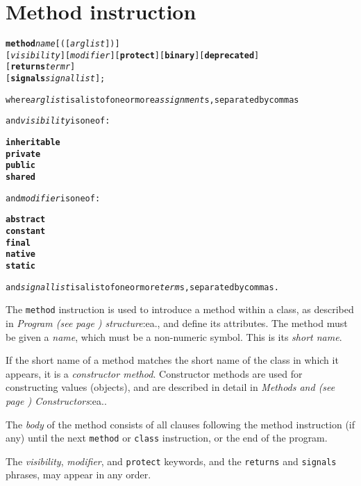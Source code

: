 \chapter{Method instruction}\label{refmethod}
\index{,}
\index{,}
\begin{shaded}
\begin{alltt}
\textbf{method} \emph{name}[([\emph{arglist}])]
               [\emph{visibility}] [\emph{modifier}] [\textbf{protect}] [\textbf{binary}] [\textbf{deprecated}]
               [\textbf{returns} \emph{termr}]
               [\textbf{signals} \emph{signallist}];

where \emph{arglist} is a list of one or more \emph{assignment}s, separated by commas

and \emph{visibility} is one of:

    \textbf{inheritable}
    \textbf{private}
    \textbf{public}
    \textbf{shared}

and \emph{modifier} is one of:

    \textbf{abstract}
    \textbf{constant}
    \textbf{final}
    \textbf{native}
    \textbf{static}

and \emph{signallist} is a list of one or more \emph{term}s, separated by commas.
\end{alltt}
\end{shaded}
 The \texttt{method} instruction is used to introduce a method within
a class, as described in  \emph{Program (see page \pageref{refpstruct}) 
structure}:ea., and define its attributes.
The method must be given a \emph{name}, which must be a non-numeric
symbol.
This is its \emph{short name}.
 
If the short name of a method matches the short name of the class in
which it appears, it is a \emph{constructor method}.
Constructor methods are used for constructing values (objects), and are
described in detail in  \emph{Methods and (see page \pageref{refmethcon}) 
Constructors}:ea..
 
The \emph{body} of the method consists of all clauses following the
method instruction (if any) until the next \texttt{method} or
\texttt{class} instruction, or the end of the program.
 
The \emph{visibility}, \emph{modifier}, and \texttt{protect}
keywords, and the \texttt{returns} and \texttt{signals} phrases, may
appear in any order.
